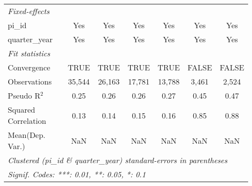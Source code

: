 \begin{tabular}{lcccccc}
   \emph{Fixed-effects}\\
   pi\_id                                                     & Yes            & Yes            & Yes            & Yes            & Yes           & Yes\\  
   quarter\_year                                              & Yes            & Yes            & Yes            & Yes            & Yes           & Yes\\  
   \midrule
   \emph{Fit statistics}\\
   Convergence                                                &TRUE            & TRUE           & TRUE           & TRUE           & FALSE         & FALSE\\  
   Observations                                               & 35,544         & 26,163         & 17,781         & 13,788         & 3,461         & 2,524\\  
   Pseudo R$^2$                                               & 0.25           & 0.26           & 0.26           & 0.27           & 0.45          & 0.47\\  
   Squared Correlation                                        & 0.13           & 0.14           & 0.15           & 0.16           & 0.85          & 0.88\\  
Mean(Dep. Var.) & NaN & NaN & NaN & NaN & NaN & NaN \\
   \midrule \midrule
   \multicolumn{7}{l}{\emph{Clustered (pi\_id \& quarter\_year) standard-errors in parentheses}}\\
   \multicolumn{7}{l}{\emph{Signif. Codes: ***: 0.01, **: 0.05, *: 0.1}}\\
\end{tabular}
\par\endgroup
